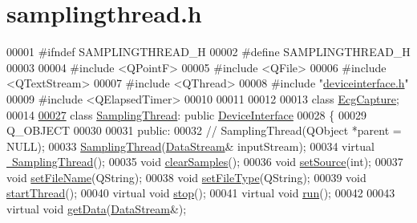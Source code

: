 \hypertarget{samplingthread_8h_source}{}\section{samplingthread.\+h}
\label{samplingthread_8h_source}

\begin{DoxyCode}
00001 \textcolor{preprocessor}{#ifndef SAMPLINGTHREAD\_H}
00002 \textcolor{preprocessor}{#define SAMPLINGTHREAD\_H}
00003 
00004 \textcolor{preprocessor}{#include <QPointF>}
00005 \textcolor{preprocessor}{#include <QFile>}
00006 \textcolor{preprocessor}{#include <QTextStream>}
00007 \textcolor{preprocessor}{#include <QThread>}
00008 \textcolor{preprocessor}{#include "\hyperlink{deviceinterface_8h}{deviceinterface.h}"}
00009 \textcolor{preprocessor}{#include <QElapsedTimer>}
00010 
00011 
00012 
00013 \textcolor{keyword}{class }\hyperlink{classEcgCapture}{EcgCapture};
00014 
\hypertarget{samplingthread_8h_source.tex_l00027}{}\hyperlink{classSamplingThread}{00027} \textcolor{keyword}{class }\hyperlink{classSamplingThread}{SamplingThread}: \textcolor{keyword}{public} \hyperlink{classDeviceInterface}{DeviceInterface}
00028 \{
00029 Q\_OBJECT
00030 
00031 \textcolor{keyword}{public}:
00032   \textcolor{comment}{//  SamplingThread(QObject *parent = NULL);}
00033     \hyperlink{classSamplingThread_a0ba71431079dd2c80adee37f3e392d98}{SamplingThread}(\hyperlink{classDataStream}{DataStream}& inputStream);
00034     \textcolor{keyword}{virtual} \hyperlink{classSamplingThread_af1f6a9a930f6c9e3c2ecc3d3d1646373}{~SamplingThread}();
00035     \textcolor{keywordtype}{void} \hyperlink{classSamplingThread_a55abdfd5263e59857dd3ef5c78489cf9}{clearSamples}();
00036     \textcolor{keywordtype}{void} \hyperlink{classSamplingThread_a3b186d0fbb2ff172593895ddb094f98d}{setSource}(\textcolor{keywordtype}{int});
00037     \textcolor{keywordtype}{void} \hyperlink{classSamplingThread_a3363a57aa7bc6a4f3867dafd1e35bd72}{setFileName}(QString);
00038     \textcolor{keywordtype}{void} \hyperlink{classSamplingThread_ade4c865b24840742b532a71208101f39}{setFileType}(QString);
00039     \textcolor{keywordtype}{void} \hyperlink{classSamplingThread_ab1284bf5429771100bf0a60ffe3aacef}{startThread}();
00040     \textcolor{keyword}{virtual} \textcolor{keywordtype}{void} \hyperlink{classSamplingThread_a6e758c7b8266755c201ca002520f5e2e}{stop}();
00041     \textcolor{keyword}{virtual} \textcolor{keywordtype}{void} \hyperlink{classSamplingThread_a3145c2d8049b3f126f78cb1274154eeb}{run}();
00042 
00043     \textcolor{keyword}{virtual} \textcolor{keywordtype}{void} \hyperlink{classSamplingThread_aa52f1e7171ae5cb8432e949635b02d25}{getData}(\hyperlink{classDataStream}{DataStream}&); 

\end{DoxyCode}
